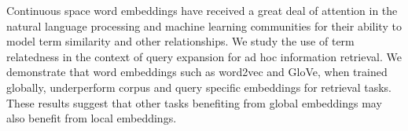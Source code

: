 Continuous space word embeddings have received a great deal of attention in the natural language processing and machine learning communities for their ability to model term similarity and other relationships.  We study the use of term relatedness in the context of query expansion for ad hoc information retrieval. We demonstrate that word embeddings such as word2vec and GloVe, when trained globally, underperform corpus and query specific embeddings for retrieval tasks.              These results suggest that other tasks benefiting from global embeddings may also benefit from local embeddings.
